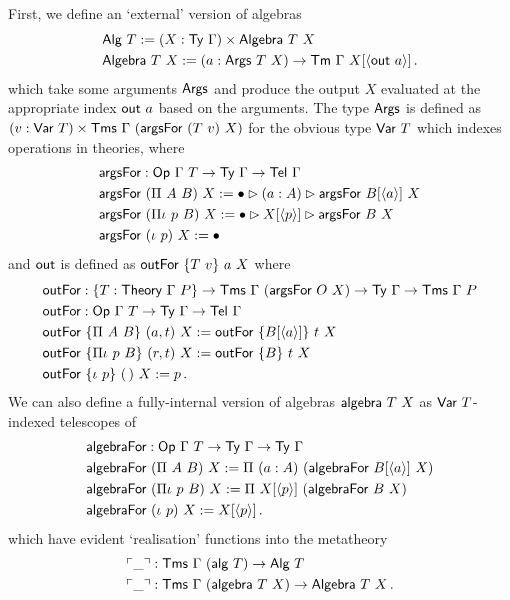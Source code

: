 First, we define an `external' version of algebras
\begin{align*}
    &\mta{Alg}\ T := (X : \Ty\ \Gamma) \times \mta{Algebra}\ T\ X \\
    &\mta{Algebra}\ T\ X := (a : \mta{Args}\ T\ X) \to \Tm\ \Gamma\ X[\Msub{\mta{out}\ a}] \,.
\end{align*}
which take some arguments $\textsf{Args}$ and produce the output $X$
evaluated at the appropriate index $\mta{out}\ a$ based on the arguments. The
type $\textsf{Args}$ is defined as $(v : \textsf{Var}\ T) \times \textsf{Tms}\ \Gamma\
(\textsf{argsFor}\ (T\ v)\ X)$ for the obvious type $\textsf{Var}\ T$ which indexes
operations in theories, where
\begin{align*}
    &\mta{argsFor} : \mta{Op}\ \Gamma\ T \to \Ty\ \Gamma \to \Tel\ \Gamma \\
    &\mta{argsFor}\ (\Pi\ A\ B)\ X := \bullet \rhd (a : A) \rhd \mta{argsFor}\ B[\Msub a]\ X \\
    &\mta{argsFor}\ (\Pi\iota\ p\ B)\ X := \bullet \rhd X[\Msub p] \rhd \mta{argsFor}\ B\ X \\
    &\mta{argsFor}\ (\iota\ p)\ X := \bullet
\end{align*}
and $\textsf{out}$ is defined as $\mta{outFor}\ \{T\ v\}\ a\ X$ where
\begin{align*}
    &\mta{outFor} : \{T : \Theory\ \Gamma\ P\} \to \Tms\ \Gamma\ (\mta{argsFor}\ O\ X) \to \Ty\ \Gamma \to \Tms\ \Gamma\ P \\
    &\mta{outFor} : \mta{Op}\ \Gamma\ T \to \Ty\ \Gamma \to \Tel\ \Gamma \\
    &\mta{outFor}\ \{\Pi\ A\ B\}\ (a, t)\ X := \mta{outFor}\ \{B[\Msub a]\}\ t\ X \\
    &\mta{outFor}\ \{\Pi\iota\ p\ B\}\ (r, t)\ X := \mta{outFor}\ \{B\}\ t\ X \\
    &\mta{outFor}\ \{\iota\ p\}\ (\,)\ X := p \,.
\end{align*}
We can also define a fully-internal version of algebras $\textsf{algebra}\ T\ X$ as $\textsf{Var}\ T$-indexed telescopes of
\begin{align*}
    &\mta{algebraFor} : \mta{Op}\ \Gamma\ T \to \Ty\ \Gamma \to \Ty\ \Gamma \\
    &\mta{algebraFor}\ (\Pi\ A\ B)\ X := \Pi\ (a : A)\ (\mta{algebraFor}\ B[\Msub a]\ X) \\
    &\mta{algebraFor}\ (\Pi\iota\ p\ B)\ X := \Pi\ X[\Msub p]\ (\mta{algebraFor}\ B\ X) \\
    &\mta{algebraFor}\ (\iota\ p)\ X := X[\Msub p] \,.
\end{align*}
which have evident `realisation' functions into the metatheory
\begin{align*}
    &\ulcorner \_ \urcorner : \textsf{Tms}\ \Gamma\ (\textsf{alg}\ T) \to \textsf{Alg}\ T \\
    &\ulcorner \_ \urcorner : \textsf{Tms}\ \Gamma\ (\textsf{algebra}\ T\ X) \to \textsf{Algebra}\ T\ X \,.
\end{align*}

